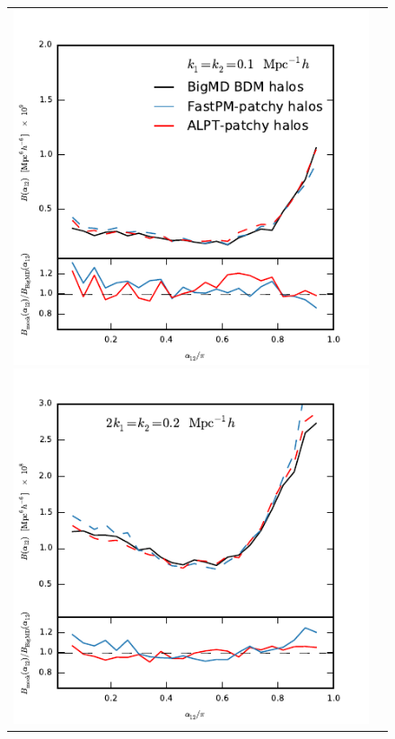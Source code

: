 \documentclass[english,usenatbib]{mn2e}
\begin{document}
\begin{figure}
\vspace{-0.5cm}
\begin{tabular}{cc}
\hspace{-0.4cm}
\includegraphics[width=1.1\columnwidth]{bispec1}
\includegraphics[width=1.1\columnwidth]{bispec3}

\end{tabular}
\end{figure}
\end{document}
